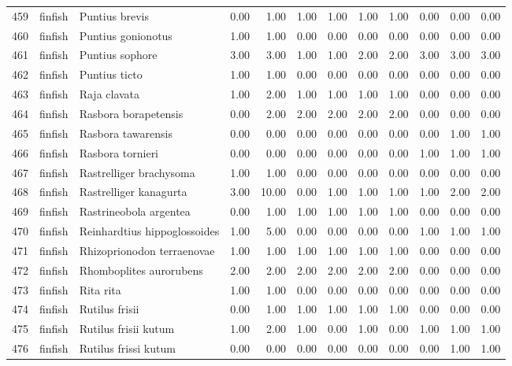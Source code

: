 \begin{table}[ht]
\begin{tabular}{rllrrrrrrrrr}
  459 & finfish & Puntius brevis & 0.00 & 1.00 & 1.00 & 1.00 & 1.00 & 1.00 & 0.00 & 0.00 & 0.00 \\ 
  460 & finfish & Puntius gonionotus & 1.00 & 1.00 & 0.00 & 0.00 & 0.00 & 0.00 & 0.00 & 0.00 & 0.00 \\ 
  461 & finfish & Puntius sophore & 3.00 & 3.00 & 1.00 & 1.00 & 2.00 & 2.00 & 3.00 & 3.00 & 3.00 \\ 
  462 & finfish & Puntius ticto & 1.00 & 1.00 & 0.00 & 0.00 & 0.00 & 0.00 & 0.00 & 0.00 & 0.00 \\ 
  463 & finfish & Raja clavata & 1.00 & 2.00 & 1.00 & 1.00 & 1.00 & 1.00 & 0.00 & 0.00 & 0.00 \\ 
  464 & finfish & Rasbora borapetensis & 0.00 & 2.00 & 2.00 & 2.00 & 2.00 & 2.00 & 0.00 & 0.00 & 0.00 \\ 
  465 & finfish & Rasbora tawarensis & 0.00 & 0.00 & 0.00 & 0.00 & 0.00 & 0.00 & 0.00 & 1.00 & 1.00 \\ 
  466 & finfish & Rasbora tornieri & 0.00 & 0.00 & 0.00 & 0.00 & 0.00 & 0.00 & 1.00 & 1.00 & 1.00 \\ 
  467 & finfish & Rastrelliger brachysoma & 1.00 & 1.00 & 0.00 & 0.00 & 0.00 & 0.00 & 0.00 & 0.00 & 0.00 \\ 
  468 & finfish & Rastrelliger kanagurta & 3.00 & 10.00 & 0.00 & 1.00 & 1.00 & 1.00 & 1.00 & 2.00 & 2.00 \\ 
  469 & finfish & Rastrineobola argentea & 0.00 & 1.00 & 1.00 & 1.00 & 1.00 & 1.00 & 0.00 & 0.00 & 0.00 \\ 
  470 & finfish & Reinhardtius hippoglossoides & 1.00 & 5.00 & 0.00 & 0.00 & 0.00 & 0.00 & 1.00 & 1.00 & 1.00 \\ 
  471 & finfish & Rhizoprionodon terraenovae & 1.00 & 1.00 & 1.00 & 1.00 & 1.00 & 1.00 & 0.00 & 0.00 & 0.00 \\ 
  472 & finfish & Rhomboplites aurorubens & 2.00 & 2.00 & 2.00 & 2.00 & 2.00 & 2.00 & 0.00 & 0.00 & 0.00 \\ 
  473 & finfish & Rita rita & 1.00 & 1.00 & 0.00 & 0.00 & 0.00 & 0.00 & 0.00 & 0.00 & 0.00 \\ 
  474 & finfish & Rutilus frisii & 0.00 & 1.00 & 1.00 & 1.00 & 1.00 & 1.00 & 0.00 & 0.00 & 0.00 \\ 
  475 & finfish & Rutilus frisii kutum & 1.00 & 2.00 & 1.00 & 0.00 & 1.00 & 0.00 & 1.00 & 1.00 & 1.00 \\ 
  476 & finfish & Rutilus frissi kutum & 0.00 & 0.00 & 0.00 & 0.00 & 0.00 & 0.00 & 0.00 & 1.00 & 1.00 \\ 

\end{tabular}
\end{table}
